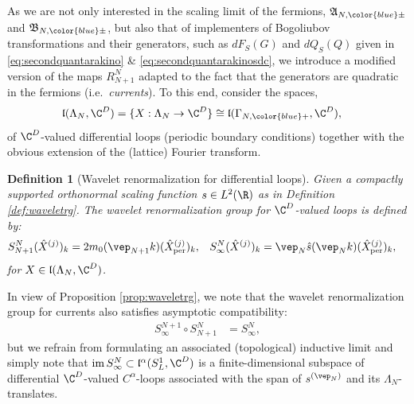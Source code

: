 \documentclass[a4paper, 11pt]{article}
\newcommand{\fA}{\mathfrak{A}}\newcommand{\cA}{\mathcal{A}}\newcommand{\dA}{\mathds{A}}\newcommand{\sA}{\mathscr{A}}
\newcommand{\fB}{\mathfrak{B}}\newcommand{\cB}{\mathcal{B}}\newcommand{\dB}{\mathds{B}}\newcommand{\sB}{\mathscr{B}}
\newcommand{\fl}{\mathfrak{l}}\newcommand{\cl}{\mathcal{l}}
\DeclareMathOperator{\1}{\mathds{1}}
\DeclareMathOperator{\im}{im}
\DeclareMathOperator{\per}{per}
\newtheorem{defn}[thm]{Definition}
\begin{document}
As we are not only interested in the scaling limit of the fermions, $\fA_{N,{\color{blue}\pm}}$ and $\fB_{N,{\color{blue}\pm}}$, but also that of implementers of Bogoliubov transformations and their generators, such as $dF_{S}(G)$ and $dQ_{S}(Q)$ given in \eqref{eq:secondquantarakino} \& \eqref{eq:secondquantarakinosdc}, we introduce a modified version of the maps $R^{N}_{N+1}$ adapted to the fact that the generators are quadratic in the fermions (i.e.~\textit{currents}). To this end, consider the spaces,
\begin{align}
\label{eq:vectcurrents}
\fl(\Lambda_{N},\C^{D}) & = \{X:\Lambda_{N}\rightarrow\C^{D}\} \cong \fl(\Gamma_{N,{\color{blue}+}},\C^{D}),
\end{align}
of $\C^{D}$-valued differential loops (periodic boundary conditions) together with the obvious extension of the (lattice) Fourier transform.
\begin{defn}[Wavelet renormalization for differential loops]
\label{def:waveletrgcur}
Given a compactly supported orthonormal scaling function $s\in L^{2}(\R)$ as in Definition \ref{def:waveletrg}. The wavelet renormalization group for $\C^{D}$-valued loops is defined by:
\begin{align}
\label{eq:waveletrgcur}
S^{N}_{N+1}(\hat{X}^{(j)})_{k} & = 2 m_{0}(\vep_{N+1}k)(\hat{X}^{(j)}_{\per})_{k}, & S^{N}_{\infty}(\hat{X}^{(j)})_{k} & = \vep_{N}\hat{s}(\vep_{N}k)(\hat{X}^{(j)}_{\per})_{k},
\end{align}
for $X\in\fl(\Lambda_{N},\C^{D})$.
\end{defn}
In view of Proposition \ref{prop:waveletrg}, we note that the wavelet renormalization group for currents also satisfies asymptotic compatibility:
\begin{align}
\label{eq:waveletrgcurcomp}
S^{N+1}_{\infty}\circ S^{N}_{N+1} & = S^{N}_{\infty},
\end{align}
but we refrain from formulating an associated (topological) inductive limit and simply note that $\im S^{N}_{\infty}\subset \fl^{\alpha}(S^{1}_{L},\C^{D})$ is a finite-dimensional subspace of differential $\C^{D}$-valued $C^{\alpha}$-loops associated with the span of $s^{(\vep_{N})}$ and its $\Lambda_{N}$-translates. 
\end{document}
